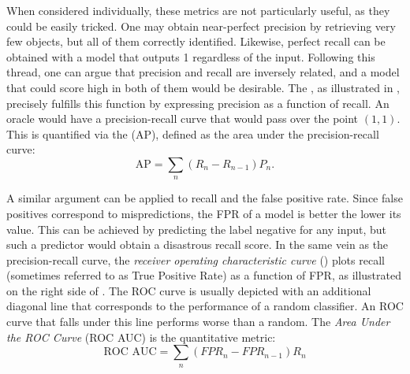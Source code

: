When considered individually, these metrics are not particularly useful, as they could be easily tricked. One may obtain near-perfect precision by retrieving very few objects, but all of them correctly identified. Likewise, perfect recall can be obtained with a model that outputs 1 regardless of the input. Following this thread, one can argue that precision and recall are inversely related, and a model that could score high in both of them would be desirable. The \textit{}, as illustrated in , precisely fulfills this function by expressing precision as a function of recall. An oracle would have a precision-recall curve that would pass over the point $(1,1)$. This is quantified via the \textit{} (AP), defined as the area under the precision-recall curve:
\begin{equation*}
    \text{AP} = \sum_n (R_n - R_{n-1})P_n.
\end{equation*}


A similar argument can be applied to recall and the false positive rate. Since false positives correspond to mispredictions, the FPR of a model is better the lower its value. This can be achieved by predicting the label negative for any input, but such a predictor would obtain a disastrous recall score. In the same vein as the precision-recall curve, the \textit{receiver operating characteristic curve} (\textit{}) plots recall (sometimes referred to as True Positive Rate) as a function of FPR, as illustrated on the right side of . The ROC curve is usually depicted with an additional diagonal line that corresponds to the performance of a random classifier. An ROC curve that falls under this line performs worse than a random. The \textit{Area Under the ROC Curve} (ROC AUC) is the quantitative metric:
\begin{equation*}
    \text{ROC AUC} = \sum_n (FPR_n - FPR_{n-1})R_n
\end{equation*}

